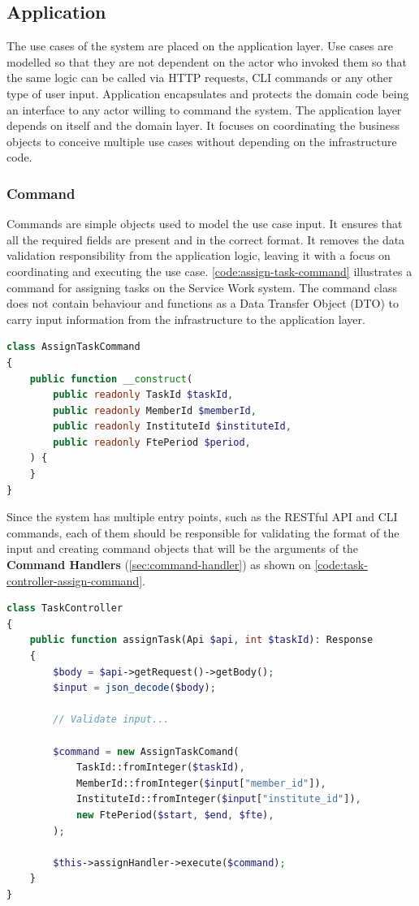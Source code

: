 \subsection{Application}

The use cases of the system are placed on the application layer. Use cases are modelled so that they are not dependent on the actor who invoked them so that the same logic can be called via HTTP requests, CLI commands or any other type of user input. Application encapsulates and protects the domain code being an interface to any actor willing to command the system. The application layer depends on itself and the domain layer. It focuses on coordinating the business objects to conceive multiple use cases without depending on the infrastructure code.

\subsubsection{Command}
\label{sec:command}

Commands are simple objects used to model the use case input. It ensures that all the required fields are present and in the correct format. It removes the data validation responsibility from the application logic, leaving it with a focus on coordinating and executing the use case. \autoref{code:assign-task-command} illustrates a command for assigning tasks on the Service Work system. The command class does not contain behaviour and functions as a Data Transfer Object (DTO) to carry input information from the infrastructure to the application layer.

\begin{lstlisting}[language=PHP,label={code:assign-task-command},caption={Class to model the command for assigning a task.}]
class AssignTaskCommand
{
	public function __construct(
    	public readonly TaskId $taskId,
    	public readonly MemberId $memberId,
    	public readonly InstituteId $instituteId,
    	public readonly FtePeriod $period,
	) {
	}
}
\end{lstlisting}

Since the system has multiple entry points, such as the RESTful API and CLI commands, each of them should be responsible for validating the format of the input and creating command objects that will be the arguments of the \textbf{Command Handlers} (\autoref{sec:command-handler}) as shown on \autoref{code:task-controller-assign-command}.

\begin{lstlisting}[language=PHP,label={code:task-controller-assign-command},caption={Usage of the \textit{Command} object on the controller.}]
class TaskController
{
	public function assignTask(Api $api, int $taskId): Response
	{
		$body = $api->getRequest()->getBody();
		$input = json_decode($body);

		// Validate input...

		$command = new AssignTaskComand(
			TaskId::fromInteger($taskId),
			MemberId::fromInteger($input["member_id"]),
			InstituteId::fromInteger($input["institute_id"]),
			new FtePeriod($start, $end, $fte),
		);

		$this->assignHandler->execute($command);
	}
}
\end{lstlisting}

